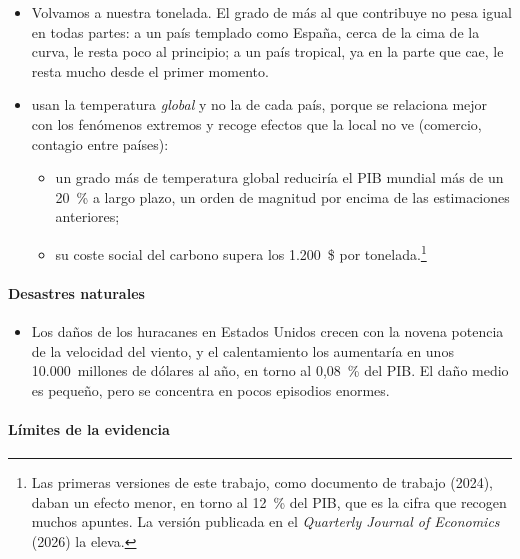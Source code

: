 \documentclass[11pt]{article}
\begin{document}
\begin{itemize}
\item Volvamos a nuestra tonelada. El grado de más al que contribuye no pesa igual en todas partes: a un país templado como España, cerca de la cima de la curva, le resta poco al principio; a un país tropical, ya en la parte que cae, le resta mucho desde el primer momento.
\item \textcite{BilalKanzig2026Macroeconomic} usan la temperatura \emph{global} y no la de cada país, porque se relaciona mejor con los fenómenos extremos y recoge efectos que la local no ve (comercio, contagio entre países):
  \begin{itemize}
  \item un grado más de temperatura global reduciría el PIB mundial más de un 20~\% a largo plazo, un orden de magnitud por encima de las estimaciones anteriores;
  \item su coste social del carbono supera los 1.200~\$ por tonelada.\footnote{Las primeras versiones de este trabajo, como documento de trabajo (2024), daban un efecto menor, en torno al 12~\% del PIB, que es la cifra que recogen muchos apuntes. La versión publicada en el \emph{Quarterly Journal of Economics} (2026) la eleva.}
  \end{itemize}
\end{itemize}

\paragraph{Desastres naturales}

\begin{itemize}
\item Los daños de los huracanes en Estados Unidos crecen con la novena potencia de la velocidad del viento, y el calentamiento los aumentaría en unos 10.000~millones de dólares al año, en torno al 0,08~\% del PIB\nocite{Nordhaus2010Economics}. El daño medio es pequeño, pero se concentra en pocos episodios enormes.
\end{itemize}

\paragraph{Límites de la evidencia}
\end{document}
